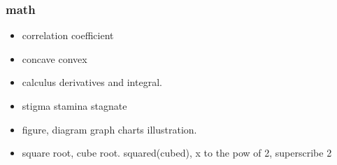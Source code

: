 \documentclass[a4paper,11pt,twoside]{book}
\begin{document}
	
\subsubsection{math}
\begin{itemize}
	\item correlation coefficient
	
	\item concave convex
	
	\item calculus derivatives and integral.
	
	\item stigma stamina stagnate 
	
	\item figure, diagram graph charts illustration.
	
	\item square root, cube root. squared(cubed), x to the pow of 2, superscribe 2
		
\end{itemize}
\end{document}
